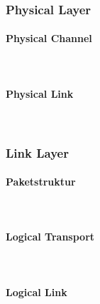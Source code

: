 \documentclass[doktyp=barbeit]{TUBAFarbeiten}
\begin{document}
		\newpage
		\subsubsection{Physical Layer}
			\label{sec: le phy}

			\paragraph{Physical Channel} \mbox{} \vspace{0.2cm} \\
				\label{sec: le phy channel}
				

			\paragraph{Physical Link} \mbox{} \vspace{0.2cm} \\
				\label{sec: le phy link}
				

		\subsubsection{Link Layer}
			\label{sec: le ll}

			\paragraph{Paketstruktur} \mbox{} \vspace{0.2cm} \\
				\label{sec: le ll paketstruktur}
				

			\paragraph{Logical Transport} \mbox{} \vspace{0.2cm} \\
				\label{sec: le ll transport}
				

			\paragraph{Logical Link} \mbox{} \vspace{0.2cm} \\
				\label{sec: le ll link}
				
\end{document}
